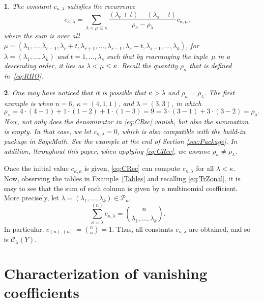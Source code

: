 \documentclass[smallextended]{svjour3}
\newtheorem{thm}{\protect\theoremname}
\newtheorem{rem}[thm]{\protect\remarkname}
\providecommand{\remarkname}{Remark}
\providecommand{\theoremname}{Theorem}
\begin{document}
\begin{thm}
The constant $c_{\kappa,\lambda}$ satisfies the recurrence \cite[eq.~14]{Muirhead}
\begin{equation}\label{eq:CRec}
  c_{\kappa,\lambda} =
  \sum_{\lambda<\mu\leq\kappa}\frac{\left(\lambda_{r}+t\right)-\left(\lambda_{s}-t\right)}{\rho_{\kappa}-\rho_{\lambda}}c_{\kappa,\mu},
\end{equation}
where the sum is over all $ \mu=(\lambda_1,\ldots,\lambda_{r-1},\lambda_r+t,\lambda_{r+1},\ldots,
  \lambda_{s-1},\lambda_s-t,\lambda_{s+1}, \allowbreak \ldots,\lambda_k)$, for $\lambda=\left(\lambda_1,\ldots,\lambda_k\right)$
and $t=1,\ldots,\lambda_s$ such that by rearranging the tuple~$\mu$
in a descending order, it lies as $\lambda<\mu\leq\kappa$. Recall the quantity
$\rho_\kappa$ that is defined in~\eqref{eq:RHO}.
\end{thm}

\begin{rem}
One may have noticed that it is possible that $\kappa>\lambda$ and $\rho_\kappa=\rho_\lambda$. The first example is when $n=6$, $\kappa=(4,1,1)$, and $\lambda=(3,3)$, in which 
\[
\rho_\kappa=4\cdot(4-1)+1\cdot(1-2)+1\cdot(1-3)=9=3\cdot(3-1)+3\cdot(3-2)=\rho_\lambda.
\]
Now, not only does the denominator in \eqref{eq:CRec} vanish, but also the summation is empty. In that case, we let $c_{\kappa,\lambda}=0$, which is also compatible with the build-in package in SageMath. See the example at the end of Section \ref{sec:Package}. In addition, throughout this paper, when applying \eqref{eq:CRec}, we assume $\rho_\kappa\neq\rho_\lambda$.
\end{rem}

Once the initial value $c_{\kappa,\kappa}$ is given,
\eqref{eq:CRec} can compute $c_{\kappa,\lambda}$ for all $\lambda<\kappa$.
Now, observing the tables in Example~\ref{Tables} and recalling \eqref{eq:TrZonal},
it is easy to see that the sum of each column is given by a multinomial
coefficient. More precisely, let
$\lambda=(\lambda_1,\ldots,\lambda_k)\in\mathcal{P}_{n}$,
\begin{equation}
  \sum_{\kappa=\lambda}^{(n)}c_{\kappa,\lambda} =
  \binom{n}{\lambda_1,\ldots,\lambda_k}.\label{eq:CInitial}
\end{equation}
In particular, $c_{(n),(n)}=\binom{n}{n}=1$.
Thus, all constants $c_{\kappa,\lambda}$ are obtained, and so is $\mathcal{C}_{\lambda}(Y)$. 


\section{Characterization of vanishing coefficients}\label{sec:zeros}
\end{document}
